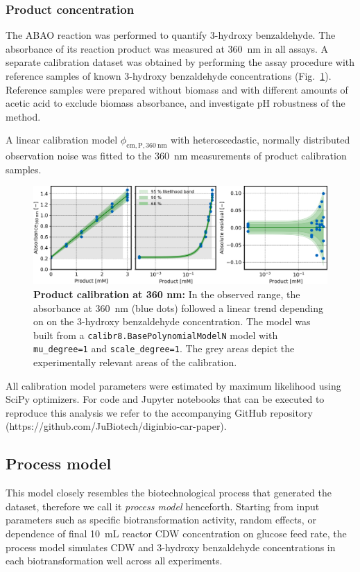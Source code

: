 \documentclass[sn-standardnature]{sn-jnl}%
\theoremstyle{thmstyleone}%
\theoremstyle{thmstyletwo}%
\theoremstyle{thmstylethree}%
\begin{document}
\subsubsection{Product concentration}
The ABAO reaction was performed to quantify 3-hydroxy benzaldehyde.
The absorbance of its reaction product was measured at 360~nm in all assays.
A separate calibration dataset was obtained by performing the assay procedure with reference samples of known 3-hydroxy benzaldehyde concentrations (Fig.~\ref{fig_cmPA360}).
Reference samples were prepared without biomass and with different amounts of acetic acid to exclude biomass absorbance, and investigate pH robustness of the method.

A linear calibration model $\phi_\mathrm{cm,P,360\ nm}$ with heteroscedastic, normally distributed observation noise was fitted to the 360~nm measurements of product calibration samples.

\begin{figure}[H]
    \centering
    \includegraphics[width=1.0\textwidth]{figures/cm_product_A360.png}
    \caption{
        \textbf{Product calibration at 360 nm:}
        In the observed range, the absorbance at 360~nm (blue dots) followed a linear trend depending on on the 3-hydroxy benzaldehyde concentration.
        The model was built from a \texttt{calibr8.BasePolynomialModelN} model with \texttt{mu\_degree=1} and \texttt{scale\_degree=1}. 
        The grey areas depict the experimentally relevant areas of the calibration.
    }
    \label{fig_cmPA360}
\end{figure}

All calibration model parameters were estimated by maximum likelihood using SciPy optimizers.
For code and Jupyter notebooks that can be executed to reproduce this analysis we refer to the accompanying GitHub repository (https://github.com/JuBiotech/diginbio-car-paper).


\subsection{Process model}
This model closely resembles the biotechnological process that generated the dataset, therefore we call it \textit{process model} henceforth.
Starting from input parameters such as specific biotransformation activity, random effects, or dependence of final 10~mL reactor CDW concentration on glucose feed rate, the process model simulates CDW and 3-hydroxy benzaldehyde concentrations in each biotransformation well across all experiments.
\end{document}
